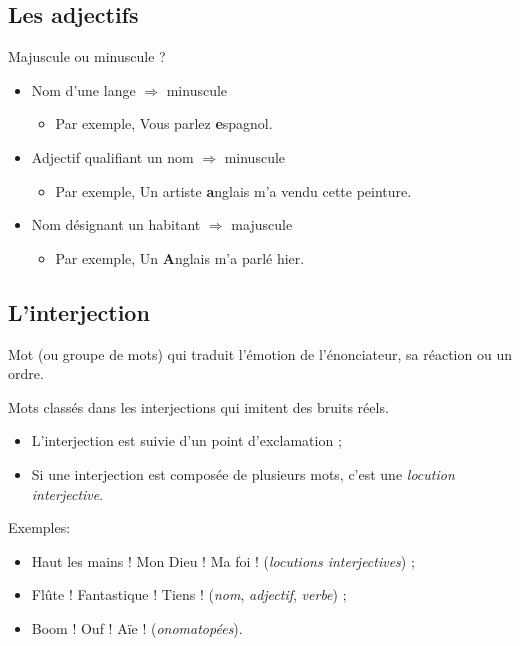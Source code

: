 \documentclass[10pt, french]{article}
\begin{document}
\begin{multicols*}{2}
\subsection{Les adjectifs}
\begin{definitionNOHFILLsub}
Majuscule ou minuscule ?
\begin{itemize}
	\item	Nom d'une lange $\Rightarrow$ minuscule
		\begin{itemize}
		\item	Par exemple, Vous parlez \textbf{e}spagnol.
		\end{itemize}
	\item	Adjectif qualifiant un nom $\Rightarrow$ minuscule
		\begin{itemize}
		\item	Par exemple, Un artiste \textbf{a}nglais m'a vendu cette peinture.
		\end{itemize}
	\item	Nom désignant un habitant $\Rightarrow$ majuscule
		\begin{itemize}
		\item	Par exemple, Un \textbf{A}nglais m'a parlé hier.
		\end{itemize}
\end{itemize}
\end{definitionNOHFILLsub}


\subsection{L'interjection}
\begin{definitionNOHFILL}[Interjection]
Mot (ou groupe de mots) qui traduit l'émotion de l'énonciateur, sa réaction ou un ordre.
\begin{definitionNOHFILL}[Onomatopées]
Mots classés dans les interjections qui imitent des bruits réels.
\end{definitionNOHFILL}
\begin{itemize}
	\item	L'interjection est suivie d'un point d'exclamation ;
	\item	Si une interjection est composée de plusieurs mots, c'est une \textit{locution interjective}.
\end{itemize}
\tcbline

Exemples:
\begin{itemize}
	\item	Haut les mains ! Mon Dieu ! Ma foi ! (\textit{locutions interjectives}) ;
	\item	Flûte ! Fantastique ! Tiens ! (\textit{nom}, \textit{adjectif}, \textit{verbe}) ;
	\item	Boom ! Ouf ! Aïe ! (\textit{onomatopées}).
\end{itemize}
\end{definitionNOHFILL}



\end{multicols*}
\end{document}
